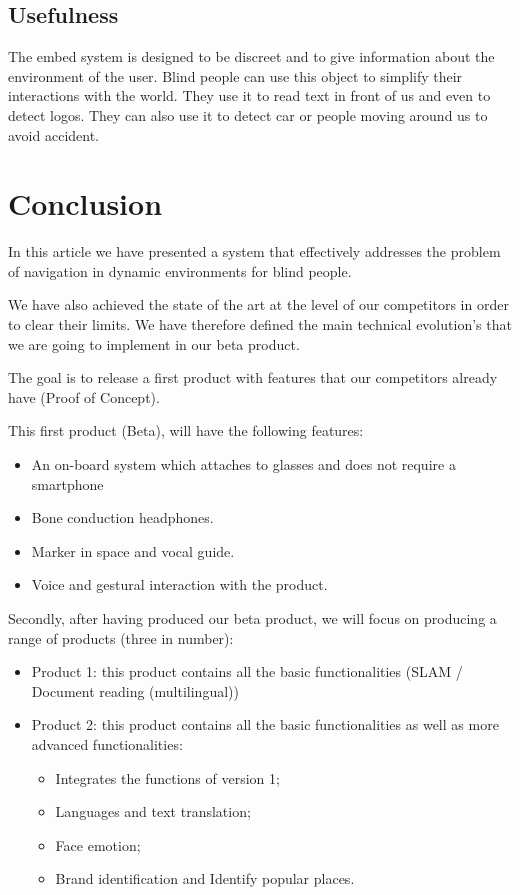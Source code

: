 \documentclass[conference,compsoc]{IEEEtran}
\begin{document}
\subsection{Usefulness}
The embed system is designed to be discreet and to give information about the environment of the user. Blind people can use this object to simplify their interactions with the world. They use it to read text in front of us and even to detect logos. They can also use it to detect car or people moving around us to avoid accident.

\section{Conclusion}

In this article we have presented a system that effectively addresses the problem of navigation in dynamic environments for blind people.

We have also achieved the state of the art at the level of our competitors in order to clear their limits.
We have therefore defined the main technical evolution's that we are going to implement in our beta product.

The goal is to release a first product with features that our competitors already have (Proof of Concept).

This first product (Beta), will have the following features:
\begin{itemize}
\item An on-board system which attaches to glasses and does not require a smartphone
\item Bone conduction headphones.
\item Marker in space and vocal guide.
\item Voice and gestural interaction with the product.
\end{itemize}

Secondly, after having produced our beta product, we will focus on producing a range of products (three in number):
\begin{itemize}
\item Product 1: this product contains all the basic functionalities (SLAM / Document reading (multilingual))
\item Product 2: this product contains all the basic functionalities as well as more advanced functionalities:
\begin{itemize}
    \item Integrates the functions of version 1;
    \item Languages and text translation;
    \item Face emotion;
    \item Brand identification and Identify popular places.
    \end{itemize}
\end{itemize}





\end{document}
